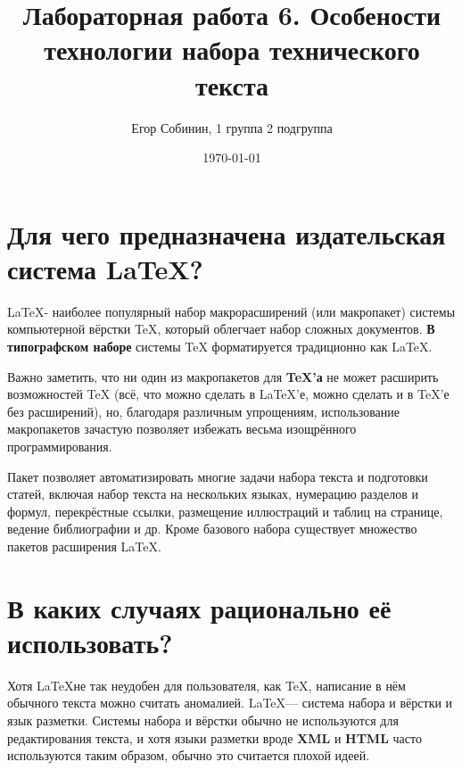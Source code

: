 \documentclass[a4paper,12pt]{article} %
\author{Егор Собинин, 1 группа 2 подгруппа}
\title{Лабораторная работа 6. Особености технологии набора технического текста}
\date{\today}
\begin{document}
\maketitle
\newpage
\section{Для чего предназначена издательская система LaTeX?}

\hspace{5mm}\LaTeX - наиболее популярный набор макрорасширений (или макропакет) системы компьютерной вёрстки TeX, который облегчает набор сложных документов. \textbf{В типографском наборе} системы TeX форматируется традиционно как \LaTeX.

\begin{flushleft}Важно заметить, что ни один из макропакетов для \textbf{TeX’а} не может расширить возможностей TeX (всё, что можно сделать в LaTeX’е, можно сделать и в TeX’е без расширений), но, благодаря различным упрощениям, использование макропакетов зачастую позволяет избежать весьма изощрённого программирования.
\end{flushleft}
\begin{center}
Пакет позволяет автоматизировать многие задачи набора текста и подготовки статей, включая набор текста на нескольких языках, нумерацию разделов и формул, перекрёстные ссылки, размещение иллюстраций и таблиц на странице, ведение библиографии и др. Кроме базового набора существует множество пакетов расширения \LaTeX.
\end{center}
\section{В каких случаях рационально её использовать?}
\begin{flushright}
Хотя \LaTeX не так неудобен для пользователя, как TeX, написание в нём обычного текста можно считать аномалией. \LaTeX — система набора и вёрстки и язык разметки. Системы набора и вёрстки обычно не используются для редактирования текста, и хотя языки разметки вроде \textbf{XML} и \textbf{HTML} часто используются таким образом, обычно это считается плохой идеей.
\end{flushright}
\end{document}
